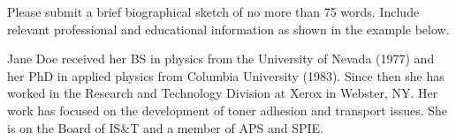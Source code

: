 \documentclass[letterpaper,twocolumn,fleqn]{article}
\begin{document}

\begin{biography}
Please submit a brief biographical sketch of no more than 75 words. 
Include relevant professional and educational information as shown 
in the example below.

Jane Doe received her BS in physics from the University of Nevada (1977) 
and her PhD in applied physics from Columbia University (1983). Since 
then she has worked in the Research and Technology Division at Xerox 
in Webster, NY. Her work has focused on the development of toner adhesion 
and transport issues. She is on the Board of  IS\&T and a member of APS 
and SPIE.
\end{biography}
\end{document}
